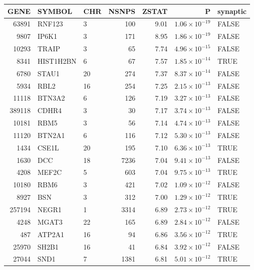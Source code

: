 \begin{table}[ht]
\centering
\begin{adjustbox}{totalheight=10in}
\begin{tabular}{rllrrrl}
  \hline
GENE & SYMBOL & CHR & NSNPS & ZSTAT & P & synaptic \\ 
  \hline
63891 & RNF123 & 3 & 100 & 9.01 & $1.06 \times 10^{-19}$ & FALSE \\ 
  9807 & IP6K1 & 3 & 171 & 8.95 & $1.86 \times 10^{-19}$ & FALSE \\ 
  10293 & TRAIP & 3 &  65 & 7.74 & $4.96 \times 10^{-15}$ & FALSE \\ 
  8341 & HIST1H2BN & 6 &  67 & 7.57 & $1.85 \times 10^{-14}$ & TRUE \\ 
  6780 & STAU1 & 20 & 274 & 7.37 & $8.37 \times 10^{-14}$ & FALSE \\ 
  5934 & RBL2 & 16 & 254 & 7.25 & $2.15 \times 10^{-13}$ & FALSE \\ 
  11118 & BTN3A2 & 6 & 126 & 7.19 & $3.27 \times 10^{-13}$ & FALSE \\ 
  389118 & CDHR4 & 3 &  30 & 7.17 & $3.74 \times 10^{-13}$ & FALSE \\ 
  10181 & RBM5 & 3 &  56 & 7.14 & $4.74 \times 10^{-13}$ & FALSE \\ 
  11120 & BTN2A1 & 6 & 116 & 7.12 & $5.30 \times 10^{-13}$ & FALSE \\ 
  1434 & CSE1L & 20 & 195 & 7.10 & $6.36 \times 10^{-13}$ & TRUE \\ 
  1630 & DCC & 18 & 7236 & 7.04 & $9.41 \times 10^{-13}$ & FALSE \\ 
  4208 & MEF2C & 5 & 603 & 7.04 & $9.75 \times 10^{-13}$ & TRUE \\ 
  10180 & RBM6 & 3 & 421 & 7.02 & $1.09 \times 10^{-12}$ & FALSE \\ 
  8927 & BSN & 3 & 312 & 7.00 & $1.29 \times 10^{-12}$ & TRUE \\ 
  257194 & NEGR1 & 1 & 3314 & 6.89 & $2.73 \times 10^{-12}$ & TRUE \\ 
  4248 & MGAT3 & 22 & 165 & 6.89 & $2.84 \times 10^{-12}$ & FALSE \\ 
  487 & ATP2A1 & 16 &  94 & 6.86 & $3.56 \times 10^{-12}$ & TRUE \\ 
  25970 & SH2B1 & 16 &  41 & 6.84 & $3.92 \times 10^{-12}$ & FALSE \\ 
  27044 & SND1 & 7 & 1381 & 6.81 & $5.01 \times 10^{-12}$ & TRUE \\ 

\end{tabular}
\end{adjustbox}
\end{table}
